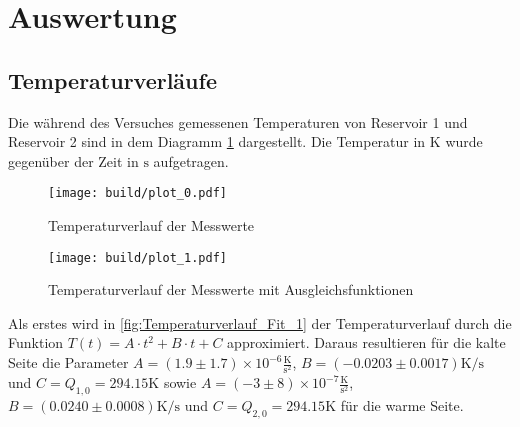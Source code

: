\section{Auswertung}
\label{sec:Auswertung}

\subsection{Temperaturverläufe}
Die während des Versuches gemessenen Temperaturen von Reservoir 1 und Reservoir 2 sind in dem Diagramm \ref{fig:Temperaturverlauf} dargestellt.
Die Temperatur in $\si{\kelvin}$ wurde gegenüber der Zeit in $\si{\second}$ aufgetragen.
\begin{figure}
  \centering
  \texttt{[image: build/plot\_0.pdf]}
  \caption{Temperaturverlauf der Messwerte}
  \label{fig:Temperaturverlauf}
\end{figure}
\begin{figure}
  \centering
  \texttt{[image: build/plot\_1.pdf]}
  \caption{Temperaturverlauf der Messwerte mit Ausgleichsfunktionen}
  \label{fig:Temperaturverlauf_Fit_1}
\end{figure}
Als erstes wird in \autoref{fig:Temperaturverlauf_Fit_1} der Temperaturverlauf durch die Funktion $T(t)=A\cdot t^2 + B\cdot t + C$ approximiert.
Daraus resultieren für die kalte Seite die Parameter $A=(1.9 \pm 1.7) \times 10^{-6} \frac{\si{\kelvin}}{\si{\second}^2}$, $B=(-0.0203 \pm 0.0017) \si{\kelvin\per\second}$ und $C=Q_{1,0}=294.15 \si{\kelvin}$ sowie
$A=(-3 \pm 8) \times 10^{-7} \frac{\si{\kelvin}}{\si{\second}^2}$, $B=(0.0240 \pm 0.0008) \si{\kelvin\per\second}$ und $C=Q_{2,0}=294.15 \si{\kelvin}$ für die warme Seite.


